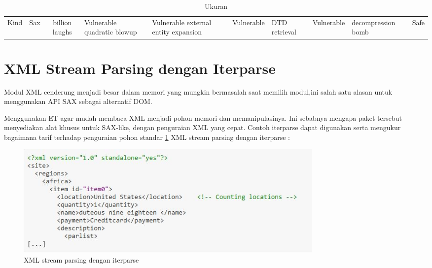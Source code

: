 \begin{table}[ht]
	\caption{Ukuran}
	\begin{tabular*}{\textwidth}{@{\extracolsep{\fill}}lcc}
		\hline
		Kind&  Sax&\cr
		\hline
		billion laughs&Vulnerable\cr
		quadratic blowup&Vulnerable\cr
		external entity expansion&Vulnerable&\cr
		DTD retrieval&Vulnerable&\cr
		decompression bomb&Safe\cr
		\hline
	\end{tabular*}
	\begin{tablenotes}
	\end{tablenotes}
\end{table}

\section{XML Stream Parsing dengan Iterparse}
\hspace*{0.5in} Modul XML cenderung menjadi besar dalam memori yang mungkin bermasalah saat memilih modul,ini salah satu alasan untuk menggunakan API SAX sebagai alternatif DOM.

\hspace*{0.5in} Menggunakan ET agar mudah membaca XML menjadi pohon memori dan memanipulasinya. Ini sebabnya mengapa paket tersebut menyediakan alat khusus untuk SAX-like, dengan penguraian XML yang cepat. Contoh iterparse dapat digunakan serta mengukur bagaimana tarif terhadap penguraian pohon standar \ref{XML stream parsing dengan iterparse} XML stream parsing dengan iterparse :
\begin{figure}[ht]
	\centerline{\includegraphics[width=0.75\textwidth]{figures/XML}}
	\caption{XML stream parsing dengan iterparse}
	\label{XML stream parsing dengan iterparse}
\end{figure}
